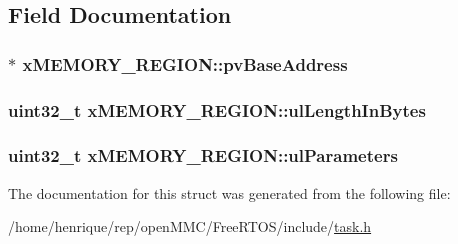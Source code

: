 \subsection{Field Documentation}
\hypertarget{structxMEMORY__REGION_a228036bbfdbc38f170e45deadb166172}{
\subsubsection[{pv\-Base\-Address}]{$\ast$ x\-M\-E\-M\-O\-R\-Y\-\_\-\-R\-E\-G\-I\-O\-N\-::pv\-Base\-Address}}\label{structxMEMORY__REGION_a228036bbfdbc38f170e45deadb166172}
\hypertarget{structxMEMORY__REGION_a97e59578d3c4c46270d33e7206258a65}{
\subsubsection[{ul\-Length\-In\-Bytes}]{\setlength{\rightskip}{0pt plus 5cm}uint32\-\_\-t x\-M\-E\-M\-O\-R\-Y\-\_\-\-R\-E\-G\-I\-O\-N\-::ul\-Length\-In\-Bytes}}\label{structxMEMORY__REGION_a97e59578d3c4c46270d33e7206258a65}
\hypertarget{structxMEMORY__REGION_a6ba180553e9a318f23acc5f4664934e3}{
\subsubsection[{ul\-Parameters}]{\setlength{\rightskip}{0pt plus 5cm}uint32\-\_\-t x\-M\-E\-M\-O\-R\-Y\-\_\-\-R\-E\-G\-I\-O\-N\-::ul\-Parameters}}\label{structxMEMORY__REGION_a6ba180553e9a318f23acc5f4664934e3}


The documentation for this struct was generated from the following file\-:\begin{DoxyCompactItemize}
\item 
/home/henrique/rep/open\-M\-M\-C/\-Free\-R\-T\-O\-S/include/\hyperlink{task_8h}{task.\-h}\end{DoxyCompactItemize}
